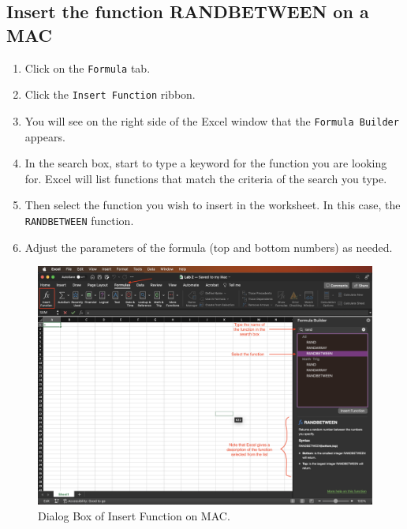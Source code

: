 \documentclass[
]{book}
\providecommand{\tightlist}{%
  \setlength{\itemsep}{0pt}\setlength{\parskip}{0pt}}
\begin{document}
\hypertarget{insert-the-function-randbetween-on-a-mac}{%
\subsection{Insert the function RANDBETWEEN on a MAC}\label{insert-the-function-randbetween-on-a-mac}}

\begin{enumerate}
\def\labelenumi{\arabic{enumi}.}
\tightlist
\item
  Click on the \texttt{Formula} tab.
\item
  Click the \texttt{Insert\ Function} ribbon.
\item
  You will see on the right side of the Excel window that the \texttt{Formula\ Builder} appears.
\item
  In the search box, start to type a keyword for the function you are looking for. Excel will list functions that match the criteria of the search you type.
\item
  Then select the function you wish to insert in the worksheet. In this case, the \texttt{RANDBETWEEN} function.
\item
  Adjust the parameters of the formula (top and bottom numbers) as needed.
\end{enumerate}

\begin{figure}

{\centering \includegraphics[width=0.9\linewidth]{insert-function-dialog-mac} 

}

\caption{Dialog Box of Insert Function on MAC.}\label{fig:insert-function-dialog-mac}
\end{figure}
\end{document}
